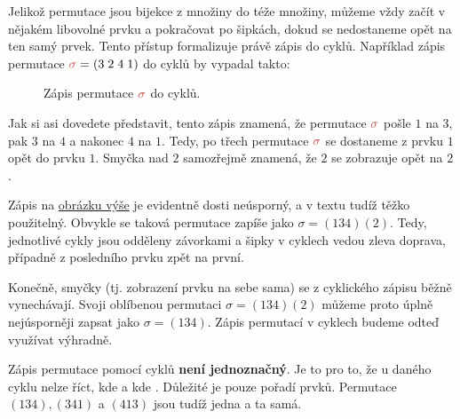 Jelikož permutace jsou bijekce z množiny do téže množiny, můžeme vždy začít v
nějakém libovolné prvku a pokračovat po šipkách, dokud se nedostaneme opět na
ten samý prvek. Tento přístup formalizuje právě zápis do cyklů. Například
zápis permutace $\clr{\sigma} = (3\;2\;4\;1)$ do cyklů by vypadal takto:
\begin{figure}[h]
 \centering
 \label{fig:permutace-jako-cyklus}
 \caption{Zápis permutace $\clr{\sigma}$ do cyklů.}
\end{figure}

Jak si asi dovedete představit, tento zápis znamená, že permutace $\clr{\sigma}$
pošle $1$ na $3$, pak $3$ na $4$ a nakonec $4$ na $1$. Tedy, po třech
 permutace $\clr{\sigma}$ se dostaneme z prvku $1$ opět do prvku
$1$. Smyčka nad $2$ samozřejmě znamená, že $2$ se zobrazuje opět na $2$.

Zápis na \hyperref[fig:permutace-jako-cyklus]{obrázku výše} je evidentně dosti
neúsporný, a v textu tudíž těžko použitelný. Obvykle se taková permutace zapíše
jako $\sigma = (134)(2)$. Tedy, jednotlivé cykly jsou odděleny závorkami a šipky
v cyklech vedou zleva doprava, případně z posledního prvku zpět na první.

Konečně, smyčky (tj. zobrazení prvku na sebe sama) se z cyklického zápisu běžně
vynechávají. Svoji oblíbenou permutaci $\sigma = (134)(2)$ můžeme proto úplně
nejúsporněji zapsat jako $\sigma = (134)$. Zápis permutací v cyklech budeme
odteď využívat výhradně.

\begin{warning}
 Zápis permutace pomocí cyklů \textbf{není jednoznačný}. Je to pro to, že u
 daného cyklu nelze říct, kde  a kde . Důležité je pouze
 pořadí prvků. Permutace $(134), (341)$ a $(413)$ jsou tudíž jedna a ta samá.
\end{warning}

